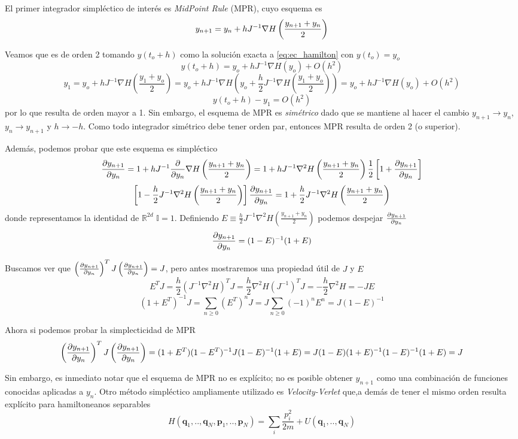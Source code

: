 El primer integrador simpléctico de interés es \textit{MidPoint Rule} (MPR), cuyo esquema es
\begin{equation}{\label{eq:MPR}}
 y_{n+1} = y_n + hJ^{-1}\nabla H\left(\frac{y_{n+1}+y_n}{2}\right)
\end{equation}

Veamos que es de orden 2 tomando $y(t_o+h)$ como la solución exacta a \eqref{eq:ec_hamilton} con $y(t_o)=y_o$
\[ y(t_o+h) = y_o + hJ^{-1}\nabla H(y_o) + O(h^2) \]
\[ y_1 = y_o + hJ^{-1}\nabla H\left(\frac{y_1+y_o}{2}\right) =  y_o + hJ^{-1}\nabla H\left(y_o + \frac{h}{2}J^{-1}\nabla H\left(\frac{y_1+y_o}{2}\right)\right) = y_o + hJ^{-1}\nabla H(y_o) + O(h^2) \]
\[ y(t_o+h) - y_1 = O(h^2) \]
por lo que resulta de orden mayor a 1.
Sin embargo, el esquema de MPR es \textit{simétrico} dado que se mantiene al hacer el cambio $y_{n+1}\to y_n$, $y_n\to y_{n+1}$ y $h\to -h$.
Como todo integrador simétrico debe tener orden par, entonces MPR resulta de orden 2 (o superior).

Además, podemos probar que este esquema es simpléctico
\[ \frac{\partial y_{n+1}}{\partial y_n} = 1 + hJ^{-1}\frac{\partial}{\partial y_n} \nabla H\left(\frac{y_{n+1}+y_n}{2}\right) = 1 + hJ^{-1} \nabla^2H\left(\frac{y_{n+1}+y_n}{2}\right)\frac{1}{2}\left[ 1+\frac{\partial y_{n+1}}{\partial y_n} \right]\]
\[ \left[ 1 - \frac{h}{2}J^{-1} \nabla^2H\left(\frac{y_{n+1}+y_n}{2}\right) \right]\frac{\partial y_{n+1}}{\partial y_n} =  1 + \frac{h}{2}J^{-1} \nabla^2H\left(\frac{y_{n+1}+y_n}{2}\right)\]
donde representamos la identidad de $\mathbb{R}^{2d}$ $\mathbb{I}=1$.
Definiendo $E\equiv\frac{h}{2}J^{-1} \nabla^2H\left(\frac{y_{n+1}+y_n}{2}\right)$ podemos despejar $\frac{\partial y_{n+1}}{\partial y_n}$
\[ \frac{\partial y_{n+1}}{\partial y_n} = (1-E)^{-1}(1+E) \]

Buscamos ver que $\left(\frac{\partial y_{n+1}}{\partial y_n}\right)^TJ\left(\frac{\partial y_{n+1}}{\partial y_n}\right)= J$, pero antes mostraremos una propiedad útil de $J$ y $E$
\[ E^T J = \frac{h}{2}\left( J^{-1} \nabla^2H \right)^T J = \frac{h}{2} \nabla^2H(J^{-1})^T  J = -\frac{h}{2} \nabla^2H = -JE\]
\[ (1 + E^T)^{-1}J = \sum_{n\geq0} \left(E^T\right)^n J = J\sum_{n\geq0} (-1)^nE^n = J(1 - E)^{-1}  \]

Ahora si podemos probar la simplecticidad de MPR
\[ \left(\frac{\partial y_{n+1}}{\partial y_n}\right)^TJ\left(\frac{\partial y_{n+1}}{\partial y_n}\right) = (1+E^T)(1-E^T)^{-1}J(1-E)^{-1}(1+E) = J(1-E)(1+E)^{-1}(1-E)^{-1}(1+E) = J\]

Sin embargo, es inmediato notar que el esquema de MPR no es explícito; no es posible obtener $y_{n+1}$ como una combinación de funciones conocidas aplicadas a $y_n$.
Otro método simpléctico ampliamente utilizado es \textit{Velocity-Verlet} que,a demás de tener el mismo orden resulta explícito para hamiltoneanos separables
\[ H(\mathbf{q}_1,..,\mathbf{q}_N,\mathbf{p}_1,..,\mathbf{p}_N) = \sum_i \frac{p_i^2}{2m} + U(\mathbf{q}_1,..,\mathbf{q}_N)\]

